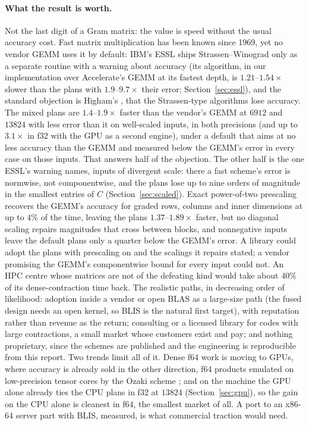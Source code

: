 \documentclass[11pt]{article}
\begin{document}
\paragraph{What the result is worth.}
Not the last digit of a Gram matrix: the value is speed without the usual
accuracy cost.
Fast matrix multiplication has been known since 1969, yet no vendor GEMM
uses it by default: IBM's ESSL ships Strassen--Winograd only as a separate
routine with a warning about accuracy \cite{ESSL} (its algorithm, in our implementation over Accelerate's GEMM at its fastest depth, is $1.21$--$1.54\times$ slower than the plans with
$1.9$--$9.7\times$ their error; Section~\ref{sec:essl}), and the standard
objection is Higham's \cite{Higham02}, that the Strassen-type algorithms lose
accuracy.  The mixed plans are
$1.4$--$1.9\times$ faster than the vendor's GEMM at $6912$ and $13824$ with
less error than it on well-scaled inputs, in both precisions (and up to
$3.1\times$ in f32 with the GPU as a second engine), under a default that
aims at no less accuracy than the GEMM and measured below the GEMM's error in
every case on those inputs.  That answers half of the objection.  The other
half is the one ESSL's warning names, inputs of divergent scale: there a
fast scheme's error is normwise, not componentwise, and the plans lose up
to nine orders of magnitude in the smallest entries of $C$
(Section~\ref{sec:scaled}).  Exact power-of-two prescaling recovers the
GEMM's accuracy for graded rows, columns and inner dimensions at up to $4\%$
of the time, leaving the plans $1.37$--$1.89\times$ faster, but no diagonal
scaling repairs magnitudes that cross between blocks, and nonnegative
inputs leave the default plans only a quarter below the GEMM's error.  A library could adopt the
plans with prescaling on and the scalings it repairs stated; a vendor
promising the GEMM's componentwise bound for every input could not.  An HPC
centre whose matrices are not of the defeating kind would take about 40\% of
its dense-contraction time back.  The
realistic paths, in decreasing order of likelihood: adoption inside a vendor
or open BLAS as a large-size path (the fused design needs an open kernel, so
BLIS is the natural first target), with reputation rather than revenue as the
return; consulting or a licensed library for codes with large contractions,
a small market whose customers exist and pay; and nothing proprietary, since
the schemes are published \cite{DPS26a,DPS26b} and the engineering is
reproducible from this report.  Two trends limit all of it.  Dense f64 work
is moving to GPUs, where accuracy is already sold in the other direction,
f64 products emulated on low-precision tensor cores by the Ozaki scheme
\cite{Ozaki12}; and on the machine the GPU alone already ties the CPU
plans in f32 at $13824$ (Section~\ref{sec:gpu}), so the gain on the CPU alone
is cleanest in f64, the smallest market of all.  A port to an x86-64 server part with BLIS, measured, is what
commercial traction would need.
\end{document}
